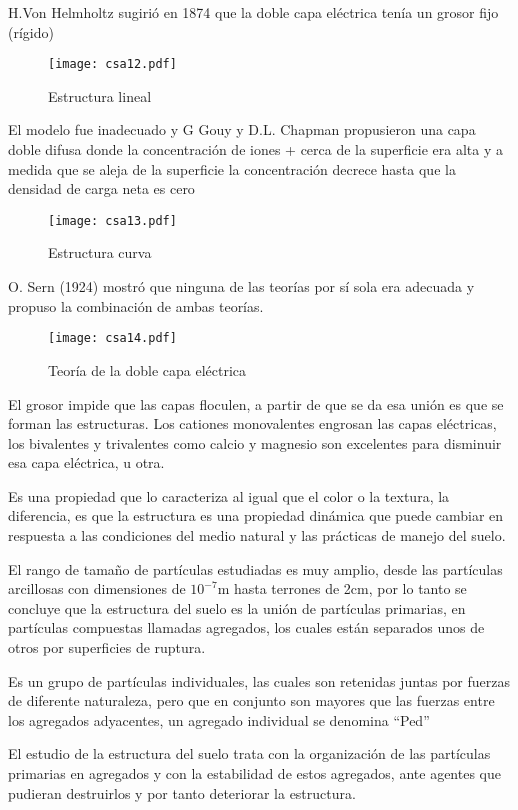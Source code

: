 H.Von Helmholtz sugirió en 1874 que la doble capa eléctrica tenía un grosor fijo (rígido)
\begin{figure}[h!]
    \centering
      \texttt{[image: csa12.pdf]}
      \caption{Estructura lineal}
      \label{csa12}
    \end{figure}
    El modelo fue inadecuado y G Gouy y D.L. Chapman propusieron una capa doble difusa donde la concentración de iones + cerca de la superficie era alta y a medida que se aleja de la superficie la concentración decrece hasta que la densidad de carga neta es cero
    \begin{figure}[h!]
    \centering
      \texttt{[image: csa13.pdf]}
      \caption{Estructura curva}
      \label{csa13}
    \end{figure}
    O. Sern (1924) mostró que ninguna de las teorías por sí sola era adecuada y propuso la combinación de ambas teorías.
    \begin{figure}[h!]
    \centering
      \texttt{[image: csa14.pdf]}
      \caption{Teoría de la doble capa eléctrica}
      \label{csa14}
    \end{figure}
    El grosor impide que las capas floculen, a partir de que se da esa unión es que se forman las estructuras.
    Los cationes monovalentes engrosan las capas eléctricas, los bivalentes y trivalentes como calcio y magnesio son excelentes para disminuir esa capa eléctrica, u otra.
    \begin{definition}[Estructura]
        Es una propiedad que lo caracteriza al igual que el color o la textura, la diferencia, es que la estructura es una propiedad dinámica que puede cambiar en respuesta a las condiciones del medio natural y las prácticas de manejo del suelo.
    \end{definition}
    El rango de tamaño de partículas estudiadas es muy amplio, desde las partículas arcillosas con dimensiones de $10^{-7}$m hasta terrones de 2cm, por lo tanto se concluye que la estructura del suelo es la unión de partículas primarias, en partículas compuestas llamadas agregados, los cuales están separados unos de otros por superficies de ruptura.
    \begin{definition}[Agregado]
        Es un grupo de partículas individuales, las cuales son retenidas juntas por fuerzas de diferente naturaleza, pero que en conjunto son mayores que las fuerzas entre los agregados adyacentes, un agregado individual se denomina ``Ped''
    \end{definition}
    El estudio de la estructura del suelo trata con la organización de las partículas primarias en agregados y con la estabilidad de estos agregados, ante agentes que pudieran destruirlos y por tanto deteriorar la estructura.
    
